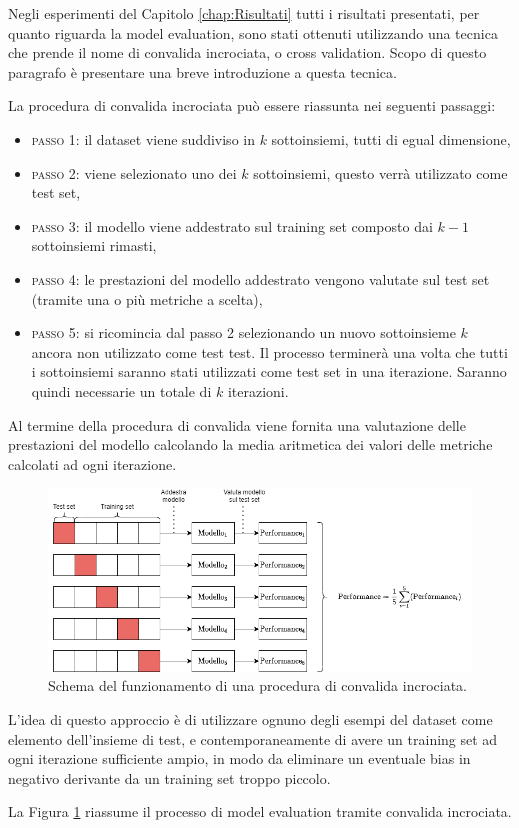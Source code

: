 \documentclass[../../main.tex]{subfiles}
\begin{document}
    Negli esperimenti del Capitolo \ref{chap:Risultati} tutti i risultati presentati, per quanto riguarda la model evaluation, sono stati ottenuti utilizzando una tecnica che prende il nome di convalida incrociata, o cross validation. Scopo di questo paragrafo è presentare una breve introduzione a questa tecnica.

    La procedura di convalida incrociata può essere riassunta nei seguenti passaggi: 
    \begin{itemize}
        \item \textsc{passo 1}: il dataset viene suddiviso in $k$ sottoinsiemi, tutti di egual dimensione,
        \item \textsc{passo 2}: viene selezionato uno dei $k$ sottoinsiemi, questo verrà utilizzato come test set,
        \item \textsc{passo 3}: il modello viene addestrato sul training set composto dai $k-1$ sottoinsiemi rimasti,
        \item \textsc{passo 4}: le prestazioni del modello addestrato vengono valutate sul test set (tramite una o più metriche a scelta),
        \item \textsc{passo 5}: si ricomincia dal passo 2 selezionando un nuovo sottoinsieme $k$ ancora non utilizzato come test test. Il processo terminerà una volta che tutti i sottoinsiemi saranno stati utilizzati come test set in una iterazione. Saranno quindi necessarie un totale di $k$ iterazioni.
    \end{itemize}

    Al termine della procedura di convalida viene fornita una valutazione delle prestazioni del modello calcolando la media aritmetica dei valori delle metriche calcolati ad ogni iterazione.

    \begin{figure}[H]
        \centering
        \includegraphics[width=\textwidth]{immagini/6_3/cross_validation.drawio.png}
        \caption{Schema del funzionamento di una procedura di convalida incrociata.}
        \label{fig:crossvalidation}
    \end{figure}

    L'idea di questo approccio è di utilizzare ognuno degli esempi del dataset come elemento dell'insieme di test, e contemporaneamente di avere un training set ad ogni iterazione sufficiente ampio, in modo da eliminare un eventuale bias in negativo derivante da un training set troppo piccolo.

    La Figura \ref{fig:crossvalidation} riassume il processo di model evaluation tramite convalida incrociata.
\end{document}
